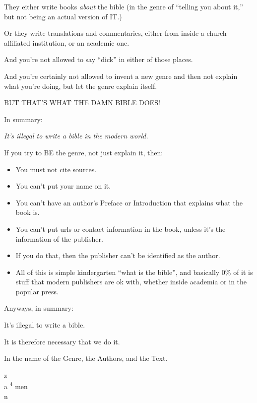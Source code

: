 \Sentence
{ \hX{} }
{ \eX{} }
{
    They either write books \emph{about} the bible (in the genre of ``telling you about it,'' but not being an actual version of IT.)

    Or they write translations and commentaries, either from inside a church affiliated institution, or an academic one.
}

\Sentence
{ \hX{} }
{ \eX{} }
{
    And you're not allowed to say ``dick'' in either of those places.

    And you're certainly not allowed to invent a new genre and then not explain what you're doing, but let the genre explain itself.

    BUT THAT'S WHAT THE DAMN BIBLE DOES!
}

\Sentence
{ \hX{} }
{ \eX{} }
{
    In summary:

    \emph{It's illegal to write a bible in the modern world.}
}

\Sentence
{ \hX{} }
{ \eX{} }
{
    If you try to BE the genre, not just explain it, then:

    \begin{itemize}

    \item You must not cite sources.

    \item You can't put your name on it.

    \item You can't have an author's Preface or Introduction that explains what the book is.

    \item You can't put urls or contact information in the book, unless it's the information of the publisher.

    \item If you do that, then the publisher can't be identified as the author.

    \item All of this is simple kindergarten ``what is the bible'', and basically 0\% of it is stuff that modern publishers are ok with, whether inside academia or in the popular press.

    \end{itemize}
}

\Sentence
{ \hX{} }
{ \eX{} }
{
    Anyways, in summary:

    It's illegal to write a bible.

    It is therefore necessary that we do it.
}

\Sentence
{ \hX{} }
{ \eX{} }
{
    In the name of the Genre, the Authors, and the Text.

    \noindent z\\
    a \textsuperscript{4} men\\
    n
}

